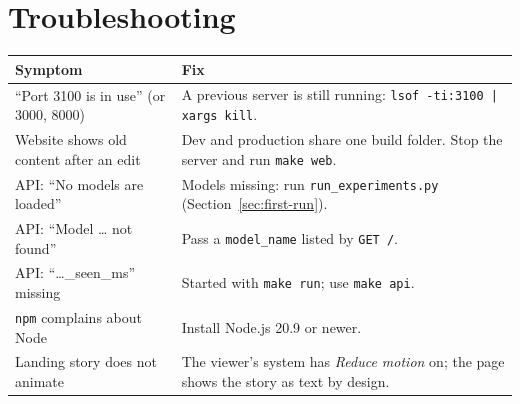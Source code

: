\documentclass[11pt, a4paper]{article}
\newcommand{\fpath}[1]{\texttt{\small #1}}
\begin{document}
\section{Troubleshooting}

\begin{center}
\small
\begin{tabularx}{\textwidth}{XX}
\toprule
\textbf{Symptom} & \textbf{Fix} \\
\midrule
``Port 3100 is in use'' (or 3000, 8000) & A previous server is still running: \texttt{lsof -ti:3100 | xargs kill}. \\
Website shows old content after an edit & Dev and production share one build folder. Stop the server and run \texttt{make web}. \\
API: ``No models are loaded'' & Models missing: run \fpath{run\_experiments.py} (Section~\ref{sec:first-run}). \\
API: ``Model \ldots{} not found'' & Pass a \texttt{model\_name} listed by \texttt{GET /}. \\
API: ``\ldots\_seen\_ms'' missing & Started with \texttt{make run}; use \texttt{make api}. \\
\texttt{npm} complains about Node & Install Node.js 20.9 or newer. \\
Landing story does not animate & The viewer's system has \emph{Reduce motion} on; the page shows the story as text by design. \\
\bottomrule
\end{tabularx}
\end{center}
\end{document}
